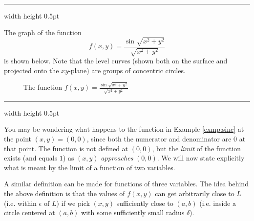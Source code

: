 \vspace{4mm}
\hrule width \textwidth height 0.5pt
\begin{exmp}\label{exmp:sinc}
 The graph of the function
 \begin{displaymath}
  f(x,y) = \dfrac{\sin \sqrt{x^2 + y^2}}{\sqrt{x^2 + y^2}}
 \end{displaymath}
 is shown below. Note that the level curves (shown both on the surface and projected onto the $xy$-plane) are groups
 of concentric circles.\vspace{-20mm}
 \begin{figure}[h]
 \begin{center}
  
 \end{center}\vspace{-12mm}
 \caption[]{\quad The function $f(x,y) = \frac{\sin \sqrt{x^2 + y^2}}{\sqrt{x^2 + y^2}}$}
 \label{fig:sinc}
\end{figure}
\end{exmp}\vspace{-4mm}
\hrule width \textwidth height 0.5pt
\vspace{4mm}

You may be wondering what happens to the function in Example \ref{exmp:sinc} at the point $(x,y) = (0,0)$, since both
the numerator and denominator are $0$ at that point. The function is not defined at $(0,0)$, but the
\emph{limit} of the function exists (and equals $1$) as $(x,y)$ \emph{approaches} $(0,0)$. We will now state explicitly
what is meant by the limit of a function of two variables.
\newpage
{}

A similar definition can be made for functions of three variables.
The idea behind the above definition is that the values of $f(x,y)$ can get arbitrarily close to $L$ (i.e.
within $\epsilon$ of $L$) if we pick $(x,y)$ sufficiently close to $(a,b)$ (i.e. inside a circle centered at
$(a,b)$ with some sufficiently small radius $\delta$).

